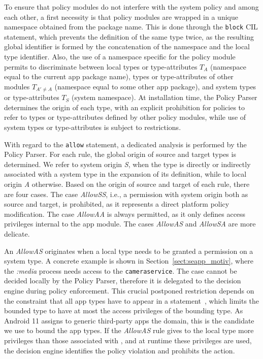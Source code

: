 To ensure that policy modules do not interfere with the system policy
and among each other, a first necessity is that policy modules are
wrapped in a unique namespace obtained from the package name.  This is
done through the {\tt block} CIL statement, which prevents the
definition of the same \sel type twice, as the resulting global
identifier is formed by the concatenation of the namespace and the
local type identifier.  Also, the use of a namespace specific for the
policy module permits to discriminate between local types or
type-attributes $T_A$ (namespace equal to the current app package
name), types or type-attributes of other modules $T_{A'\neq A}$
(namespace equal to some other app package), and system types or
type-attributes $T_S$ (system namespace).  At installation time, the
\seapp Policy Parser determines the origin of each type, with an
explicit prohibition for policies to refer to types or type-attributes
defined by other policy modules, while use of system types or
type-attributes is subject to restrictions.


With regard to the {\tt allow} statement, a dedicated analysis is
performed by the \seapp Policy Parser.  For each rule, the global origin
of source and target types is determined.  We refer to system origin
{\em S}, when the type is directly or indirectly associated with a
system type in the expansion of its definition, while to local origin
{\em A} otherwise.  Based on the origin of source and target of each
rule, there are four cases.  The case {\em AllowSS}, i.e., a
permission with system origin both as source and target, is
prohibited, as it represents a direct platform policy modification.
The case {\em AllowAA} is always permitted, as it only defines access
privileges internal to the app module.  The cases {\em AllowAS} and
{\em AllowSA} are more delicate.

An {\em AllowAS} originates when a local type needs to be granted a
permission on a system type.  A concrete example is shown in
Section~\ref{sect:seapp_motiv}, where the {\em :media} process needs
access to the {\tt camera\textunderscore service}.  The case cannot be
decided locally by the \seapp Policy Parser, therefore it is delegated
to the \sel decision engine during policy enforcement.  This crucial
postponed restriction depends on the constraint that all app types
have to appear in a \typebounds statement~\cite{seapp_typebounds},
which limits the bounded type to have at most the access privileges of
the bounding type.  As Android 11 assigns to generic third-party apps
the \untrustedapp domain, this is the candidate we use to bound the
app types.  If the {\em AllowAS} rule gives to the local type more
privileges than those associated with \untrustedapp, and at runtime
these privileges are used, the \sel decision engine identifies the
policy violation and prohibits the action.

